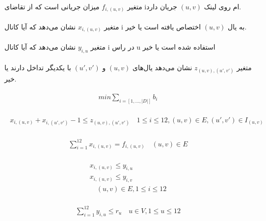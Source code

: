 \documentclass[paper=a4, fontsize=11pt]{article}
\numberwithin{equation}{section} %
\numberwithin{figure}{section} %
\numberwithin{table}{section} %
\begin{document}
\paragraph{}
متغیر $f_{i,(u,v)}$ میزان جریانی است که از تقاضای iام روی لینک
$(u,v)$ جریان دارد.

\paragraph{}
متغیر $x_{i,(u,v)}$ نشان می‌دهد که آیا کانال i به یال $(u,v)$
اختصاص یافته است یا خیر.

\paragraph{}
متغیر $y_{i,u}$ نشان می‌دهد
که آیا کانال i در راس u استفاده شده است یا خیر

\paragraph{}
متغیر $z_{(u,v),(u',v')}$
نشان می‌دهد یال‌های $(u,v)$ و $(u',v')$ با یکدیگر تداخل دارند یا خیر.

\begin{align}
\begin{split}
	min \sum_{i = [1, ..., |D|]} b_i
\end{split}
\end{align}

\begin{align}
\begin{split}
	x_{i,(u,v)} + x_{i,(u',v')} - 1 \le z_{(u,v),(u',v')}
	\quad
	1 \le i \le 12, (u,v) \in E, (u',v') \in I_{(u,v)}
\end{split}
\end{align}

\begin{align}
\begin{split}
	\sum_{i=1}^{12} x_{i,(u,v)} = f_{i,(u,v)}
	\quad (u,v) \in E
\end{split}
\end{align}

\begin{align}
\begin{split}
	x_{i,(u,v)} \le y_{i,u}\\
	x_{i,(u,v)} \le y_{i,v}\\
	\quad (u,v) \in E, 1 \le i \le 12
\end{split}
\end{align}

\begin{align}
\begin{split}
	\sum_{i=1}^{12} y_{i,u} \le r_u
	\quad u \in V, 1 \le u \le 12
\end{split}
\end{align}
\end{document}
